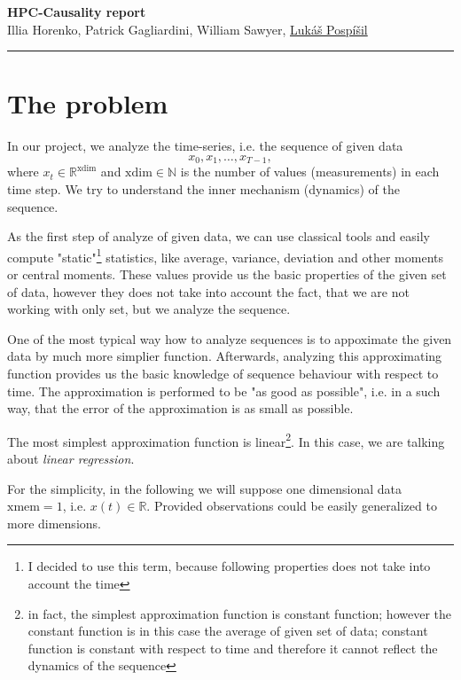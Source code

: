 \documentclass{article}
\newcommand{\MakeTitlePage}
{
  \begin{center}
    \vspace{10mm}
    \sffamily
    {\huge\bfseries
    {HPC-Causality report}\\
    }
    \bigskip
    \bigskip
    {\large
	 \vspace{0.5cm}
	 {Illia Horenko, Patrick Gagliardini, William Sawyer, \underline{Luk\'{a}\v{s} Posp\'{i}\v{s}il}}	
    }
  \end{center}
  \vspace{10mm}
  \hrule
}
\begin{document}
 \MakeTitlePage
 \tableofcontents
 \newpage

 \section {The problem}

 In our project, we analyze the time-series, i.e. the sequence of given data
 \begin{equation}
  \label{eq:timeseries}
	x_0, x_1, \dots, x_{T-1},
 \end{equation}
 where $x_t \in \mathbb{R}^{\mathrm{xdim}}$ and $\mathrm{xdim} \in \mathbb{N}$ is the number of values (measurements) in each time step. 
 We try to understand the inner mechanism (dynamics) of the sequence. \newline
 
 As the first step of analyze of given data, we can use classical tools and easily compute "static"\footnote{I decided to use this term, because following properties does not take into account the time} statistics, like average, variance, deviation and other moments or central moments.
 These values provide us the basic properties of the given set of data, however they does not take into account the fact, that we are not working with only set, but we analyze the sequence.

 One of the most typical way how to analyze sequences is to appoximate the given data by much more simplier function. Afterwards, analyzing this approximating function provides us the basic knowledge of sequence behaviour with respect to time. 
 The approximation is performed to be "as good as possible", i.e. in a such way, that the error of the approximation is as small as possible.
 
 The most simplest approximation function is linear\footnote{in fact, the simplest approximation function is constant function; however the constant function is in this case the average of given set of data; constant function is constant with respect to time and therefore it cannot reflect the dynamics of the sequence}.
 In this case, we are talking about \emph{linear regression}.
 
 For the simplicity, in the following we will suppose one dimensional data $\mathrm{xmem} = 1$, i.e. $x(t) \in \mathbb{R}$. 
 Provided observations could be easily generalized to more dimensions.
 
\end{document}
